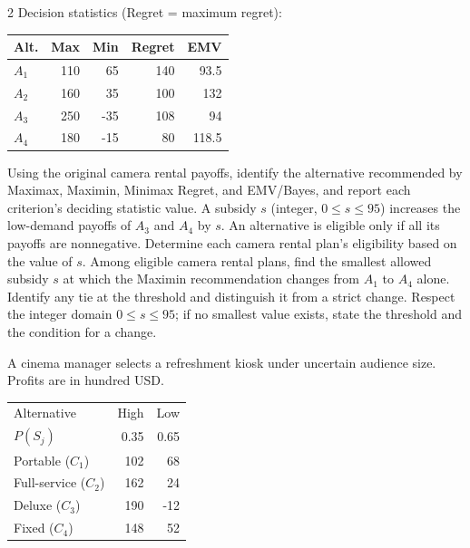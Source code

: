 \begin{multicols}{2}
Decision statistics (Regret = maximum regret):

\vspace{-4mm}
\begin{center}\small\setlength{\tabcolsep}{4pt}
	\begin{tabular}{lrrrr}\toprule
		Alt. & Max & Min & Regret & EMV\\ \midrule
				$A_1$ & 110 & 65 & 140 & 93.5\\
		$A_2$ & 160 & 35 & 100 & 132\\
		$A_3$ & 250 & -35 & 108 & 94\\
		$A_4$ & 180 & -15 & 80 & 118.5\\
		\bottomrule
	\end{tabular}
\end{center}
\vspace{-4mm}

\noindent Using the original camera rental payoffs, identify the alternative recommended by Maximax, Maximin, Minimax Regret, and EMV/Bayes, and report each criterion's deciding statistic value.  A subsidy $s$ (integer, $0\leq s\leq95$) increases the low-demand payoffs of $A_3$ and $A_4$ by $s$. An alternative is eligible only if all its payoffs are nonnegative. Determine each camera rental plan's eligibility based on the value of $s$.  Among eligible camera rental plans, find the smallest allowed subsidy $s$ at which the Maximin recommendation changes from $A_1$ to $A_4$ alone. Identify any tie at the threshold and distinguish it from a strict change. Respect the integer domain $0\leq s\leq95$; if no smallest value exists, state the threshold and the condition for a change. 


A cinema manager selects a refreshment kiosk under uncertain audience size. Profits are in hundred USD. \vspace{-3mm}

\begin{center}\small\setlength{\tabcolsep}{4pt}
	\begin{tabular}{lrr}\toprule
		Alternative & High & Low\\
		$P(S_j)$ & 0.35 & 0.65\\ \midrule
				Portable ($C_1$) & 102 & 68\\
		Full-service ($C_2$) & 162 & 24\\
		Deluxe ($C_3$) & 190 & -12\\
		Fixed ($C_4$) & 148 & 52\\
		\bottomrule
	\end{tabular}
\end{center} \vspace{-4mm}


\end{multicols}
